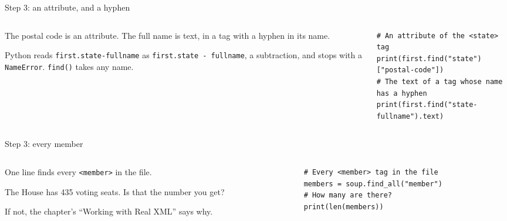 \documentclass[9pt,aspectratio=169]{beamer}
\begin{document}
\begin{frame}[fragile]{Step 3: an attribute, and a hyphen}
    \begin{columns}[T]
        \begin{column}{0.37\textwidth}
            The postal code is an attribute. The full name is text, in a tag with a hyphen in its name.

            \medskip
            Python reads \texttt{first.state-fullname} as \texttt{first.state - fullname}, a subtraction, and stops with a \texttt{NameError}. \texttt{find()} takes any name.
        \end{column}
        \begin{column}{0.6\textwidth}
\begin{lstlisting}
# An attribute of the <state> tag
print(first.find("state")["postal-code"])
# The text of a tag whose name has a hyphen
print(first.find("state-fullname").text)
\end{lstlisting}
        \end{column}
    \end{columns}
\end{frame}

\begin{frame}[fragile]{Step 3: every member}
    \begin{columns}[T]
        \begin{column}{0.37\textwidth}
            One line finds every \texttt{<member>} in the file.

            \medskip
            The House has 435 voting seats. Is that the number you get?

            \medskip
            If not, the chapter's ``Working with Real XML'' says why.
        \end{column}
        \begin{column}{0.6\textwidth}
\begin{lstlisting}
# Every <member> tag in the file
members = soup.find_all("member")
# How many are there?
print(len(members))
\end{lstlisting}
        \end{column}
    \end{columns}
\end{frame}
\end{document}
